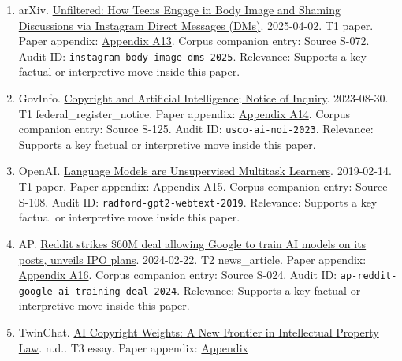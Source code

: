 \documentclass[
  american,
  11pt,
  letterpaper,
]{article}
\begin{document}
\begin{enumerate}
  \texttt{waller-anderson-online-polarization-2020}. Relevance: Supports
  a key factual or interpretive move inside this paper.
\item
  arXiv. \href{https://arxiv.org/abs/2504.02176}{Unfiltered: How Teens
  Engage in Body Image and Shaming Discussions via Instagram Direct
  Messages (DMs)}. 2025-04-02. T1 paper. Paper appendix:
  \hyperref[ch-10-appendix-a13-unfiltered-how-teens-engage-in-body-image-and-shaming-discussions-via-instagram-direct-messages-dms]{Appendix
  A13}. Corpus companion entry: Source S-072. Audit ID:
  \texttt{instagram-body-image-dms-2025}. Relevance: Supports a key
  factual or interpretive move inside this paper.
\item
  GovInfo.
  \href{https://www.govinfo.gov/content/pkg/FR-2023-08-30/pdf/2023-18624.pdf}{Copyright
  and Artificial Intelligence; Notice of Inquiry}. 2023-08-30. T1
  federal\_register\_notice. Paper appendix:
  \hyperref[ch-10-appendix-a14-copyright-and-artificial-intelligence-notice-of-inquiry]{Appendix
  A14}. Corpus companion entry: Source S-125. Audit ID:
  \texttt{usco-ai-noi-2023}. Relevance: Supports a key factual or
  interpretive move inside this paper.
\item
  OpenAI.
  \href{https://cdn.openai.com/better-language-models/language_models_are_unsupervised_multitask_learners.pdf}{Language
  Models are Unsupervised Multitask Learners}. 2019-02-14. T1 paper.
  Paper appendix:
  \hyperref[ch-10-appendix-a15-language-models-are-unsupervised-multitask-learners]{Appendix
  A15}. Corpus companion entry: Source S-108. Audit ID:
  \texttt{radford-gpt2-webtext-2019}. Relevance: Supports a key factual
  or interpretive move inside this paper.
\item
  AP.
  \href{https://apnews.com/article/a7f131c7cb4225307134ef21d3c6a708}{Reddit
  strikes \$60M deal allowing Google to train AI models on its posts,
  unveils IPO plans}. 2024-02-22. T2 news\_article. Paper appendix:
  \hyperref[ch-10-appendix-a16-reddit-strikes-60m-deal-allowing-google-to-train-ai-models-on-its-posts-unveils-ipo-plans]{Appendix
  A16}. Corpus companion entry: Source S-024. Audit ID:
  \texttt{ap-reddit-google-ai-training-deal-2024}. Relevance: Supports a
  key factual or interpretive move inside this paper.
\item
  TwinChat.
  \href{https://medium.com/twinchat/ai-copyright-weights-a-new-frontier-in-intellectual-property-law-d8ee1b6c55ee}{AI
  Copyright Weights: A New Frontier in Intellectual Property Law}. n.d..
  T3 essay. Paper appendix:
  \hyperref[ch-10-appendix-a17-ai-copyright-weights-a-new-frontier-in-intellectual-property-law]{Appendix
}
\end{enumerate}
\end{document}
